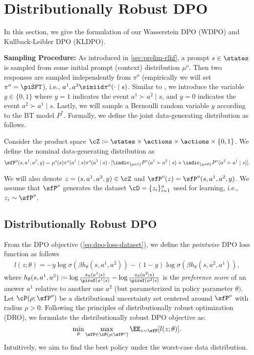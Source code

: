\section{Distributionally Robust DPO}

In this section, we give the formulation of our Wasserstein DPO (WDPO) and Kullback-Leibler DPO (KLDPO). 

\textbf{Sampling Procedure: } As introduced in \cref{sec:prelim-rlhf}, a prompt $s\in\states$ is sampled from some initial prompt (context) distribution $\mu^o$. Then two responses are sampled independently from $\pi^o$ (empirically we will set $\pi^o=\piSFT$), i.e., $a^1,a^2 \simiid \pi^o(\cdot\mid s)$. Similar to \citet{zhu2023principled}, we introduce the variable $y\in\{0,1\}$ where $y=1$ indicates the event $a^1\succ a^2\mid s$, and $y=0$ indicates the event $a^2\succ a^1\mid s$. Lastly, we will sample a Bernoulli random variable $y$ according to the BT model $P^*$. Formally, we define the joint data-generating distribution as follows.
\begin{definition}
    Consider the product space $\cZ\coloneqq \states\times\actions\times\actions\times\{0,1\}$. We define the nominal data-generating distribution as
    \begin{align*}
        \sfP^o(s,a^1,a^2,y) = \mu^o(s)\pi^o(a^1\mid s)\pi^o(a^2\mid s)\cdot[\indic_{\{y=1\}}P^*(a^1\succ a^2\mid s) + \indic_{\{y=0\}}P^*(a^2\succ a^1\mid s)].
    \end{align*}
\end{definition}
We will also denote $z=(s,a^1,a^2,y)\in\cZ$ and $\sfP^o(z)=\sfP^o(s,a^1,a^2,y)$. We assume that  $\sfP^o$ generates the dataset $\cD=\{z_i\}_{i=1}^n$ used for learning, i.e., $z_i\sim\sfP^o$.

\subsection{Distributionally Robust DPO}
From the DPO objective (\cref{eq:dpo-loss-dataset}), we define the \textit{pointwise} DPO loss function as follows
\begin{align}\label{eq:pointwise-dpo-loss}
    l(z;\theta) = -y \log\sigma(\beta h_\theta(s,a^1,a^2)) - (1-y) \log\sigma(\beta h_\theta(s,a^2,a^1)),
\end{align}
where $h_\theta(s,a^1,a^2)\coloneqq \log\frac{\pi_\theta(a^1\mid s)}{\piref(a^1\mid s)}-\log\frac{\pi_\theta(a^2\mid s)}{\piref(a^2\mid s)}$ is the \textit{preference score} of an answer $a^1$ relative to another one $a^2$ (but parameterized in policy parameter $\theta)$. Let $\cP(\rho;\sfP^o)$ be a distributional uncertainty set centered around $\sfP^o$ with radius $\rho>0$. Following the principles of distributionally robust optimization (DRO), we formulate the distributionally robust DPO objective as:
\begin{equation}\label{eq:generic-drdro-objective}
\min_{\theta} \max_{\sfP\in\cP(\rho;\sfP^o)} \EE_{z\sim\sfP} [l(z;\theta)].
\end{equation}
Intuitively, we aim to find the best policy under the worst-case data distribution. 

